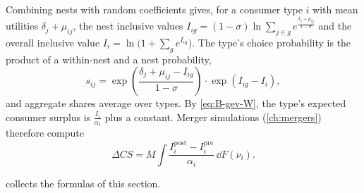 \begin{remark}\label{rem:B-rcnl-welfare}
Combining nests with random coefficients \citep{GrigolonVerboven2014} gives, for a consumer type $i$ with mean
utilities $\delta_j + \mu_{ij}$, the nest inclusive values
$I_{ig} = (1 - \sigma)\ln\sum_{j \in g}e^{\frac{\delta_j + \mu_{ij}}{1 - \sigma}}$ and the overall inclusive value
$I_i = \ln\big(1 + \sum_ge^{I_{ig}}\big)$. The type's choice probability is the product of a within-nest and a
nest probability,
\begin{equation*}
s_{ij} = \exp\left(\frac{\delta_j + \mu_{ij} - I_{ig}}{1 - \sigma}\right)\cdot\exp\left(I_{ig} - I_i\right),
\end{equation*}
and aggregate shares average over types. By \eqref{eq:B-gev-W}, the type's expected consumer surplus is
$\frac{I_i}{\alpha_i}$ plus a constant. Merger simulations (\cref{ch:mergers}) therefore compute
\begin{equation*}
\Delta CS = M\int\frac{I_i^{\mathrm{post}} - I_i^{\mathrm{pre}}}{\alpha_i}\,\dd F(\nu_i) .
\end{equation*}
\end{remark}

 collects the formulas of this section.

